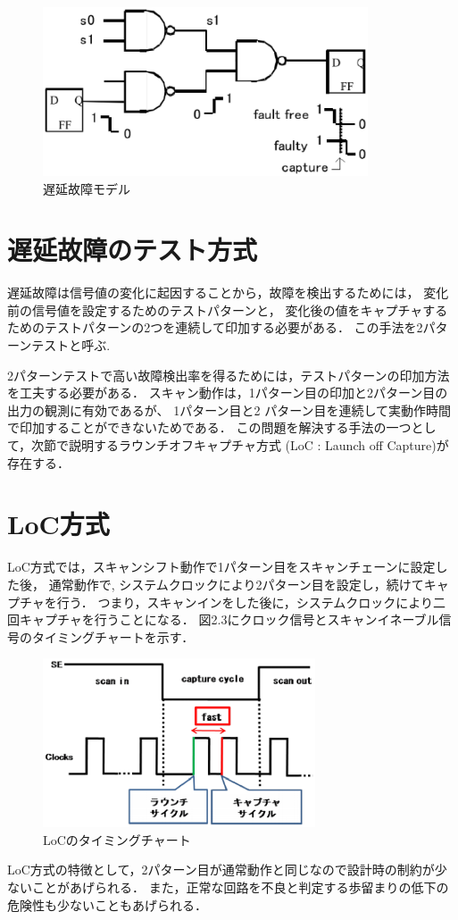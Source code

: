 \begin{figure}[h]
\begin{center}
	\includegraphics[height=50mm]{transfault.eps}
	\caption{遅延故障モデル}
\end{center}
\end{figure}

\section{遅延故障のテスト方式}
遅延故障は信号値の変化に起因することから，故障を検出するためには，
変化前の信号値を設定するためのテストパターンと，
変化後の値をキャプチャするためのテストパターンの2つを連続して印加する必要がある．
この手法を2パターンテストと呼ぶ.

2パターンテストで高い故障検出率を得るためには，テストパターンの印加方法を工夫する必要がある．
スキャン動作は，1パターン目の印加と2パターン目の出力の観測に有効であるが、
1パターン目と2 パターン目を連続して実動作時間で印加することができないためである．
この問題を解決する手法の一つとして，次節で説明するラウンチオフキャプチャ方式
(LoC : Launch off Capture)が存在する．

\section{LoC方式}
LoC方式\cite{transfault}では，スキャンシフト動作で1パターン目をスキャンチェーンに設定した後，
通常動作で, システムクロックにより2パターン目を設定し，続けてキャプチャを行う．
つまり，スキャンインをした後に，システムクロックにより二回キャプチャを行うことになる．
図2.3にクロック信号とスキャンイネーブル信号のタイミングチャートを示す．

\begin{figure}[h]
	\begin{center}
		\includegraphics[height=50mm]{LoC.eps}
		\caption{LoCのタイミングチャート}
	\end{center}
\end{figure}

LoC方式の特徴として，2パターン目が通常動作と同じなので設計時の制約が少ないことがあげられる．
また，正常な回路を不良と判定する歩留まりの低下の危険性も少ないこともあげられる．

